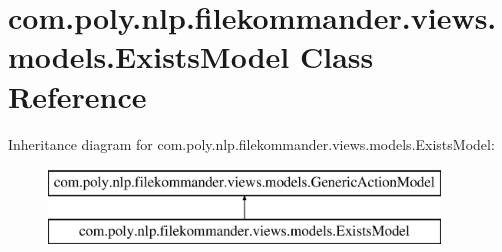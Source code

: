 \hypertarget{classcom_1_1poly_1_1nlp_1_1filekommander_1_1views_1_1models_1_1_exists_model}{\section{com.\-poly.\-nlp.\-filekommander.\-views.\-models.\-Exists\-Model Class Reference}
\label{classcom_1_1poly_1_1nlp_1_1filekommander_1_1views_1_1models_1_1_exists_model}
}
Inheritance diagram for com.\-poly.\-nlp.\-filekommander.\-views.\-models.\-Exists\-Model\-:\begin{figure}[H]
\begin{center}
\leavevmode
\includegraphics[height=2.000000cm]{classcom_1_1poly_1_1nlp_1_1filekommander_1_1views_1_1models_1_1_exists_model}
\end{center}
\end{figure}
